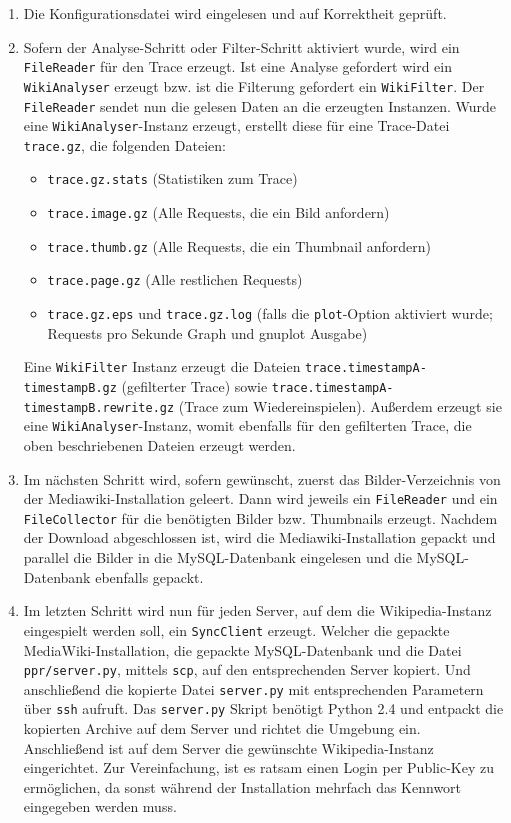 \begin{enumerate}
\item Die Konfigurationsdatei wird eingelesen und auf Korrektheit geprüft.
\item Sofern der Analyse-Schritt oder Filter-Schritt aktiviert wurde, wird ein \texttt{FileReader} für den Trace erzeugt. Ist eine Analyse gefordert wird ein \texttt{WikiAnalyser} erzeugt bzw. ist die Filterung gefordert ein \texttt{WikiFilter}. Der \texttt{FileReader} sendet nun die gelesen Daten an die erzeugten Instanzen. Wurde eine \texttt{WikiAnalyser}-Instanz erzeugt, erstellt diese für eine Trace-Datei \texttt{trace.gz}, die folgenden Dateien:
  \begin{itemize}
  \item \texttt{trace.gz.stats} (Statistiken zum Trace)
  \item \texttt{trace.image.gz} (Alle Requests, die ein Bild anfordern)
  \item \texttt{trace.thumb.gz} (Alle Requests, die ein Thumbnail anfordern)
  \item \texttt{trace.page.gz} (Alle restlichen Requests)
  \item \texttt{trace.gz.eps} und \texttt{trace.gz.log} (falls die \texttt{plot}-Option aktiviert wurde; Requests pro Sekunde Graph und gnuplot Ausgabe)
  \end{itemize}
Eine \texttt{WikiFilter} Instanz erzeugt die Dateien \texttt{trace.timestampA-timestampB.gz} (gefilterter Trace) sowie \texttt{trace.timestampA-timestampB.rewrite.gz} (Trace zum Wiedereinspielen). Außerdem erzeugt sie eine \texttt{WikiAnalyser}-Instanz, womit ebenfalls für den gefilterten Trace, die oben beschriebenen Dateien erzeugt werden.
\item Im nächsten Schritt wird, sofern gewünscht, zuerst das Bilder-Verzeichnis von der Mediawiki-Installation geleert. Dann wird jeweils ein \texttt{FileReader} und ein \texttt{File\-Collector} für die benötigten Bilder bzw. Thumbnails erzeugt. Nachdem der Download abgeschlossen ist, wird die Mediawiki-Installation gepackt und parallel die Bilder in die MySQL-Datenbank eingelesen und die MySQL-Datenbank ebenfalls gepackt.
\item Im letzten Schritt wird nun für jeden Server, auf dem die Wikipedia-Instanz eingespielt werden soll, ein \texttt{SyncClient} erzeugt. Welcher die gepackte MediaWiki-Installation, die gepackte MySQL-Datenbank und die Datei \texttt{ppr/server.py}, mittels \texttt{scp}, auf den entsprechenden Server kopiert. Und anschließend die kopierte Datei \texttt{server.py} mit entsprechenden Parametern über \texttt{ssh} aufruft. Das \texttt{server.py} Skript benötigt Python 2.4 und entpackt die kopierten Archive auf dem Server und richtet die Umgebung ein. Anschließend ist auf dem Server die gewünschte Wikipedia-Instanz eingerichtet. Zur Vereinfachung, ist es ratsam einen Login per Public-Key zu ermöglichen, da sonst während der Installation mehrfach das Kennwort eingegeben werden muss.
\end{enumerate}

